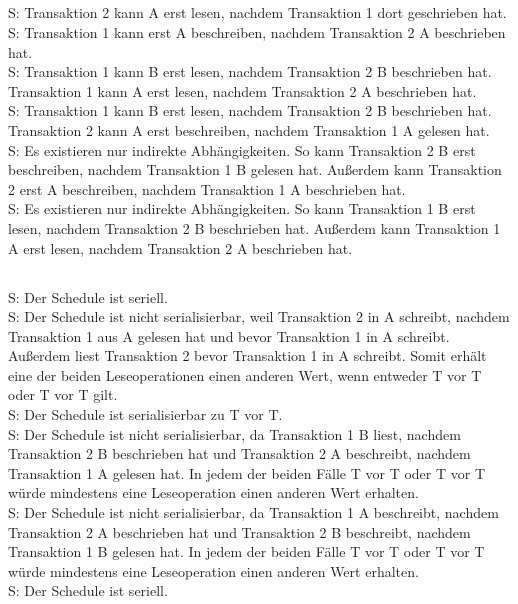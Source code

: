 \documentclass[ngerman]{gdb-aufgabenblatt}
\begin{document}
	\subsection{} %
		S: Transaktion 2 kann A erst lesen, nachdem Transaktion 1 dort geschrieben hat. \\
		S: Transaktion 1 kann erst A beschreiben, nachdem Transaktion 2 A beschrieben hat. \\
		S: Transaktion 1 kann B erst lesen, nachdem Transaktion 2 B beschrieben hat. Transaktion 1 kann A erst lesen, nachdem Transaktion 2 A beschrieben hat. \\
		S: Transaktion 1 kann B erst lesen, nachdem Transaktion 2 B beschrieben hat. Transaktion 2 kann A erst beschreiben, nachdem Transaktion 1 A gelesen hat. \\
		S: Es existieren nur indirekte Abhängigkeiten. So kann Transaktion 2 B erst beschreiben, nachdem Transaktion 1 B gelesen hat. Außerdem kann Transaktion 2 erst A beschreiben, nachdem Transaktion 1 A beschrieben hat. \\
		S: Es existieren nur indirekte Abhängigkeiten. So kann Transaktion 1 B erst lesen, nachdem Transaktion 2 B beschrieben hat. Außerdem kann Transaktion 1 A erst lesen, nachdem Transaktion 2 A beschrieben hat.
	\subsection{} %
		S: Der Schedule ist seriell. \\
		S: Der Schedule ist nicht serialisierbar, weil Transaktion 2 in A schreibt, nachdem Transaktion 1 aus A gelesen hat und bevor Transaktion 1 in A schreibt. Außerdem liest Transaktion 2 bevor Transaktion 1 in A schreibt. Somit erhält eine der beiden Leseoperationen einen anderen Wert, wenn entweder T vor T oder T vor T gilt. \\
		S: Der Schedule ist serialisierbar zu T vor T.\\
		S: Der Schedule ist nicht serialisierbar, da Transaktion 1 B liest, nachdem Transaktion 2 B beschrieben hat und Transaktion 2 A beschreibt, nachdem Transaktion 1 A gelesen hat. In jedem der beiden Fälle T vor T oder T vor T würde mindestens eine Leseoperation einen anderen Wert erhalten. \\
		S: Der Schedule ist nicht serialisierbar, da Transaktion 1 A beschreibt, nachdem Transaktion 2 A beschrieben hat und Transaktion 2 B beschreibt, nachdem Transaktion 1 B gelesen hat. In jedem der beiden Fälle T vor T oder T vor T würde mindestens eine Leseoperation einen anderen Wert erhalten.\\
		S: Der Schedule ist seriell.
\end{document}
